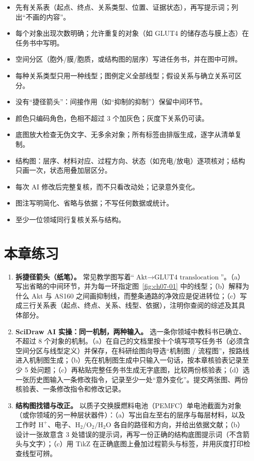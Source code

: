 \begin{itemize}
\item 先有关系表（起点、终点、关系类型、位置、证据状态），再写提示词；列出“不画的内容”。
\item 每个对象出现次数明确；允许重复的对象（如 GLUT4 的储存态与膜上态）在任务书中写明。
\item 空间分区（胞外/膜/胞质，或结构图的层序）写进任务书，并在图中可辨。
\item 每种关系类型只用一种线型；图例定义全部线型；假设关系与确立关系可区分。
\item 没有“捷径箭头”：间接作用（如“抑制的抑制”）保留中间环节。
\item 颜色只编码角色，色相不超过 3 个加灰色；灰度下关系仍可读。
\item 底图放大检查无伪文字、无多余对象；所有标签由排版生成，逐字从清单复制。
\item 结构图：层序、材料对应、过程方向、状态（如充电/放电）逐项核对；结构只画一次，状态用叠加层区分。
\item 每次 AI 修改后完整复核，而不只看改动处；记录意外变化。
\item 图注写明简化、省略与依据；不写任何数据或统计。
\item 至少一位领域同行复核关系与结构。
\end{itemize}

\section{本章练习}

\begin{enumerate}
\item \textbf{拆捷径箭头（纸笔）。} 常见教学图写着“$\text{Akt} \rightarrow \text{GLUT4 translocation}$”。（a）写出省略的中间环节，并为每一环指定图~\ref{fig:ch07-01} 中的线型；（b）解释为什么 Akt 与 AS160 之间画抑制线，而整条通路的净效应是促进转位；（c）写成三行关系表（起点、终点、关系、线型、依据），注明你查阅的综述及其具体部分。

\item \textbf{SciDraw AI 实操：同一机制，两种输入。} 选一条你领域中教科书已确立、不超过 8 个对象的机制。（a）在自己的文档里按十个填写项写任务书（必须含空间分区与线型定义）并保存，在科研绘图向导选“机制图 / 流程图”，按路线进入机制图生成；（b）先在机制图生成中只输入一句话，按本章核验表记录至少 5 处问题；（c）再粘贴完整任务书生成无字底图，比较两份核验表；（d）选一张历史图输入一条修改指令，记录至少一处“意外变化”。提交两张图、两份核验表、一条修改指令和修改记录。

\item \textbf{结构图找错与改正。} 以质子交换膜燃料电池（PEMFC）单电池截面为对象（或你领域的另一种层状器件）：（a）写出自左至右的层序与每层材料，以及工作时 $\text{H}^+$、电子、$\text{H}_2/\text{O}_2/\text{H}_2\text{O}$ 各自的路径和方向，并给出依据文献；（b）设计一张故意含 3 处错误的提示词，再写一份正确的结构底图提示词（不含箭头与文字）；（c）用 TikZ 在正确底图上叠加过程箭头与标签，并用灰度打印检查线型可辨。
\end{enumerate}

